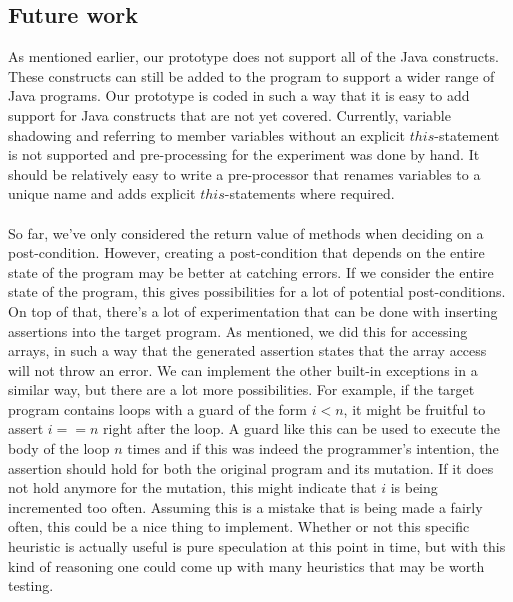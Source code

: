 \documentclass[a4paper, fleqn]{article}
\begin{document}
\subsection{Future work}
As mentioned earlier, our prototype does not support all of the Java constructs. These constructs can still be added to the program to support a wider range of Java programs. Our prototype is coded in such a way that it is easy to add support for Java constructs that are not yet covered. Currently, variable shadowing and referring to member variables without an explicit $this$-statement is not supported and pre-processing for the experiment was done by hand. It should be relatively easy to write a pre-processor that renames variables to a unique name and adds explicit $this$-statements where required.
\\\\
So far, we've only considered the return value of methods when deciding on a post-condition. However, creating a post-condition that depends on the entire state of the program may be better at catching errors. If we consider the entire state of the program, this gives possibilities for a lot of potential post-conditions. On top of that, there's a lot of experimentation that can be done with inserting assertions into the target program. As mentioned, we did this for accessing arrays, in such a way that the generated assertion states that the array access will not throw an error. We can implement the other built-in exceptions in a similar way, but there are a lot more possibilities. For example, if the target program contains loops with a guard of the form $i {<} n$, it might be fruitful to assert $i {==} n$ right after the loop. A guard like this can be used to execute the body of the loop $n$ times and if this was indeed the programmer's intention, the assertion should hold for both the original program and its mutation. If it does not hold anymore for the mutation, this might indicate that $i$ is being incremented too often. Assuming this is a mistake that is being made a fairly often, this could be a nice thing to implement. Whether or not this specific heuristic is actually useful is pure speculation at this point in time, but with this kind of reasoning one could come up with many heuristics that may be worth testing.
\end{document}
